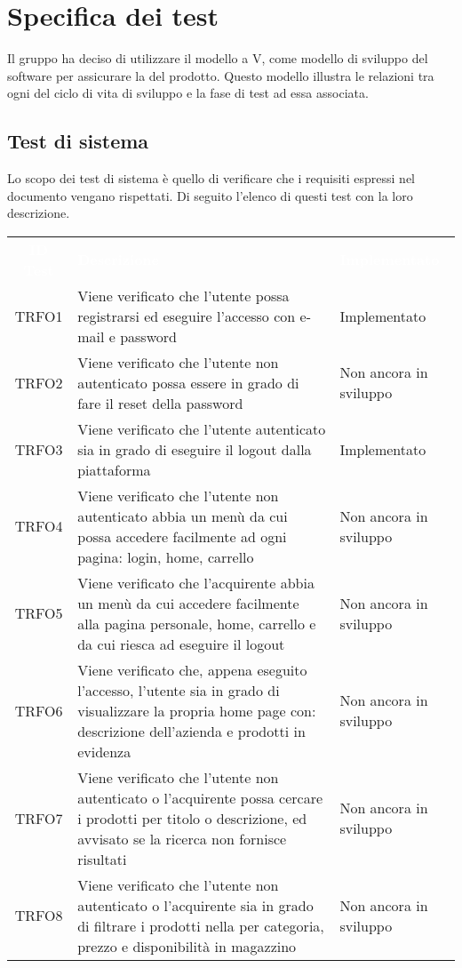 \section{Specifica dei test}
\label{specificatest}
Il gruppo ha deciso di utilizzare il modello a V, come modello di sviluppo del software per assicurare la  del prodotto. Questo modello illustra le relazioni tra ogni  del ciclo di vita di sviluppo e la fase di test ad essa associata.
\subsection{Test di sistema}
Lo scopo dei test di sistema è quello di verificare che i requisiti espressi nel documento \AdR{} vengano rispettati. Di seguito l'elenco di questi test con la loro descrizione.
\begin{longtable}{|c| C{10cm} |C{3cm}|}
	\textcolor{white}{\textbf{ID Test}}&
	\textcolor{white}{\textbf{Descrizione}}&
	\textcolor{white}{\textbf{Implementato}}\label{tab:TestSistema1}\\
	TRFO1 & Viene verificato che l'utente possa registrarsi ed eseguire l'accesso con e-mail e password & Implementato\\ \hline
	TRFO2 & Viene verificato che l'utente non autenticato possa essere in grado di fare il reset della password & Non ancora in sviluppo\\ \hline
	TRFO3 & Viene verificato che l'utente autenticato sia in grado di eseguire il logout dalla piattaforma & Implementato\\ \hline
	TRFO4 & Viene verificato che l'utente non autenticato abbia un menù da cui possa accedere facilmente ad ogni pagina: login, home, carrello & Non ancora in sviluppo\\ \hline
	TRFO5 & Viene verificato che l'acquirente abbia un menù da cui accedere facilmente alla pagina personale, home, carrello e da cui riesca ad eseguire il logout & Non ancora in sviluppo\\ \hline
	TRFO6 & Viene verificato che, appena eseguito l'accesso, l'utente sia in grado di visualizzare la propria home page con: descrizione dell'azienda e prodotti in evidenza & Non ancora in sviluppo\\ \hline
	TRFO7 & Viene verificato che l'utente non autenticato o l'acquirente possa cercare i prodotti per titolo o descrizione, ed avvisato se la ricerca non fornisce risultati & Non ancora in sviluppo\\ \hline
	TRFO8 & Viene verificato che l'utente non autenticato o l'acquirente sia in grado di filtrare i prodotti nella  per categoria, prezzo e disponibilità in magazzino & Non ancora in sviluppo\\ \hline

\end{longtable}
